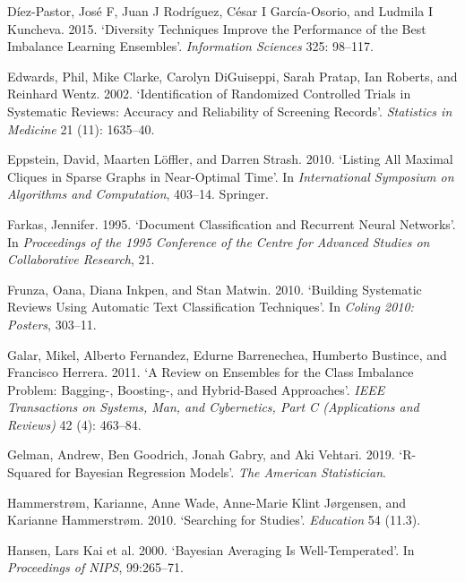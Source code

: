 \documentclass{article}
\newlength{\cslhangindent}
\newenvironment{CSLReferences}[2] %
 {%
  \setlength{\parindent}{0pt}
  \ifodd #1 \everypar{\setlength{\hangindent}{\cslhangindent}}\ignorespaces\fi
  \ifnum #2 > 0
  \setlength{\parskip}{#2\baselineskip}
  \fi
 }%
 {}
\begin{document}
\begin{CSLReferences}{1}{0}
\leavevmode{}%
Díez-Pastor, José F, Juan J Rodríguez, César I García-Osorio, and
Ludmila I Kuncheva. 2015. {`Diversity Techniques Improve the Performance
of the Best Imbalance Learning Ensembles'}. \emph{Information Sciences}
325: 98--117.

\leavevmode{}%
Edwards, Phil, Mike Clarke, Carolyn DiGuiseppi, Sarah Pratap, Ian
Roberts, and Reinhard Wentz. 2002. {`Identification of Randomized
Controlled Trials in Systematic Reviews: Accuracy and Reliability of
Screening Records'}. \emph{Statistics in Medicine} 21 (11): 1635--40.

\leavevmode{}%
Eppstein, David, Maarten Löffler, and Darren Strash. 2010. {`Listing All
Maximal Cliques in Sparse Graphs in Near-Optimal Time'}. In
\emph{International Symposium on Algorithms and Computation}, 403--14.
Springer.

\leavevmode{}%
Farkas, Jennifer. 1995. {`Document Classification and Recurrent Neural
Networks'}. In \emph{Proceedings of the 1995 Conference of the Centre
for Advanced Studies on Collaborative Research}, 21.

\leavevmode{}%
Frunza, Oana, Diana Inkpen, and Stan Matwin. 2010. {`Building Systematic
Reviews Using Automatic Text Classification Techniques'}. In
\emph{Coling 2010: Posters}, 303--11.

\leavevmode{}%
Galar, Mikel, Alberto Fernandez, Edurne Barrenechea, Humberto Bustince,
and Francisco Herrera. 2011. {`A Review on Ensembles for the Class
Imbalance Problem: Bagging-, Boosting-, and Hybrid-Based Approaches'}.
\emph{IEEE Transactions on Systems, Man, and Cybernetics, Part C
(Applications and Reviews)} 42 (4): 463--84.

\leavevmode{}%
Gelman, Andrew, Ben Goodrich, Jonah Gabry, and Aki Vehtari. 2019.
{`R-Squared for Bayesian Regression Models'}. \emph{The American
Statistician}.

\leavevmode{}%
Hammerstrøm, Karianne, Anne Wade, Anne-Marie Klint Jørgensen, and
Karianne Hammerstrøm. 2010. {`Searching for Studies'}. \emph{Education}
54 (11.3).

\leavevmode{}%
Hansen, Lars Kai et al. 2000. {`Bayesian Averaging Is Well-Temperated'}.
In \emph{Proceedings of NIPS}, 99:265--71.


\end{CSLReferences}
\end{document}
